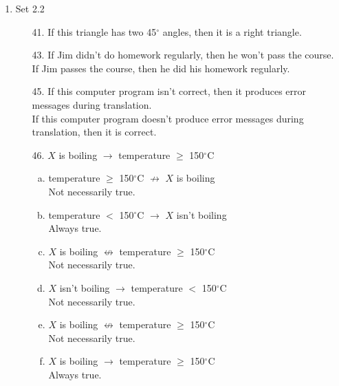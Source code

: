 \documentclass[letterpaper]{article}
\begin{document}
\begin{enumerate}
\begin{enumerate}
			\item Set 2.2
			\begin{itemize}
				\item [41.] If this triangle has two 45$^\circ$ angles, then it is a right triangle.
				\item [43.] 
				If Jim didn't do homework regularly, then he won't pass the course. \\
				If Jim passes the course, then he did his homework regularly.
				\item [45.]
				If this computer program isn't correct, then it produces error messages during translation. \\
				If this computer program doesn't produce error messages during translation, then it is correct.
				\item [46.] $X$ is boiling $\rightarrow$ temperature $\geq$ 150$^\circ$C
				\begin{enumerate}[(a)]
					\item 
					temperature $\geq$ 150$^\circ$C $\not\rightarrow$ $X$ is boiling \\
					Not necessarily true.
					\item 
					temperature $<$ 150$^\circ$C $\rightarrow$ $X$ isn't boiling \\
					Always true.
					\item
					$X$ is boiling $\not\leftrightarrow$ temperature $\geq$ 150$^\circ$C \\
					Not necessarily true.
					\item
					$X$ isn't boiling $\rightarrow$ temperature $<$ 150$^\circ$C \\
					Not necessarily true.
					\item
					$X$ is boiling $\not\leftrightarrow$ temperature $\geq$ 150$^\circ$C \\
					Not necessarily true.
					\item
					$X$ is boiling $\rightarrow$ temperature $\geq$ 150$^\circ$C \\
					Always true.
				\end{enumerate}
			\end{itemize}
		\end{enumerate}
		

\end{enumerate}
\end{document}
